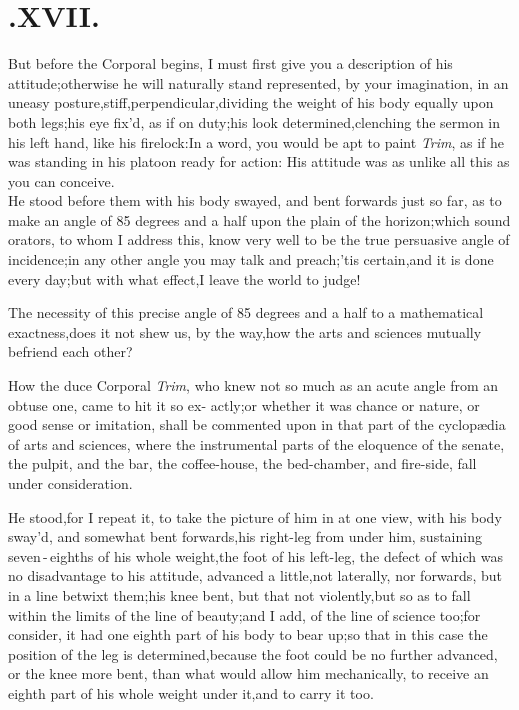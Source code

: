 \documentclass{article}
\begin{document}
\null
\section{.\enspace  XVII.}

\quad\tsh But before the Corporal
begins, I must first give you a description of his
attitude;\tsh otherwise he will naturally stand
represented, by your imagination, in an uneasy
posture,\tsk stiff,\tsk perpendi\-cular,\tsk dividing the
weight of his body equally upon both legs;\tsh his eye fix’d,
as if on duty;\tsk his look determined,\tsk\break clenching the
sermon in his left hand, like his firelock:\tsk In a word,
you would be apt to paint \textit{Trim}, as if he was standing in his
platoon ready for action:\tsh\break
His attitude was as unlike all this as you\break
can conceive.\\
\newpage
He stood before them with his body swayed, and bent forwards
just so far, as to make an angle of 85 degrees and a half upon the
plain of the horizon;\tsh\break which sound orators, to whom I address
this, know very well to be the true persuasive angle of
incidence;\tsk in any other angle you may talk and
preach;\tsk ’tis certain,\tsk and it is done every
day;\tsk\break but with what effect,\tsk I leave the world to
judge!

The necessity of this precise angle of 85 degrees and a half to
a mathematical exactness,\tsh does it not shew us, by the
way,\tsk how the arts and sciences mutually befriend each other?

How the duce Corporal \textit{Trim}, who\break
knew not so much as an acute angle\break
from an obtuse one, came to hit it so ex-
actly;\tsh or whether it was chance or nature, or good
sense or imitation, \etc\break shall be commented upon in that part of
the cyclopædia of arts and sciences, where the instrumental
parts of the eloquence of the senate, the pulpit, and the bar, the
coffee-house, the bed-chamber, and fire-side, fall under
consideration.

He stood,\tsh for I repeat it, to take the picture of
him in at one view, with his body sway’d, and somewhat bent
forwards,\tsk his right-leg from under him, sustaining
seven\,-\,eighths of his whole\break
weight,\tsk the foot of his
left-leg, the defect of which was no disadvantage to his attitude,
advanced a little,\tsk not laterally, nor forwards, but in a line
betwixt them;\tsk his knee bent, but that not
violently,\tsk but so as to fall within the limits of the line of
beauty;\tsk and I add,
of the line of science too;\tsk for
consider, it had one eighth part of his body to bear up;\tsk so
that in this case the position of the leg is
determined,\tsk because the foot could be no further advanced, or
the knee more bent, than what would allow him mechanically,
to receive an eighth part of his whole weight under\break
it,\tsk and to carry it too.
\end{document}
